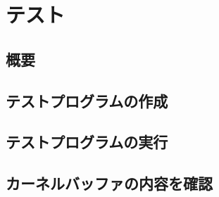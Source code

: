 \documentclass[12pt]{jsarticle}
\begin{document}
\section{テスト}
\subsection{概要}
\subsection{テストプログラムの作成}
\subsection{テストプログラムの実行}
\subsection{カーネルバッファの内容を確認}
\end{document}
